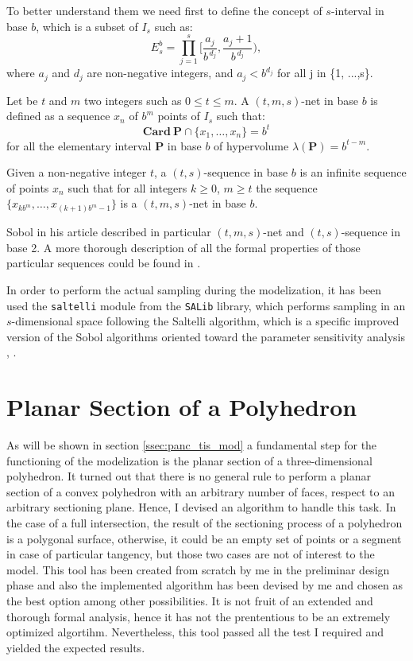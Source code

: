     To better understand them we need first to define the concept of $s$-interval in base $b$, which is a subset of $I_s$ such as:
    \begin{equation}
        E_s^b = \prod_{j=1}^{s} \Bigg[ \frac{a_j}{b^{\,d_j}}, \frac{a_j + 1}{b^{\,d_j}}\Bigg),
    \end{equation}
    where $a_j$ and $d_j$ are non-negative integers, and $a_j < b^{d_j}$ for all j in \{1, ...,s\}.

    Let be $t$ and $m$ two integers such as $0 \leq t \leq m$. A $(t,m,s)$-net in base $b$ is defined as a sequence $x_n$ of $b^m$ points of $I_s$ such that:
    \begin{equation}
        \mathbf{Card} \ \mathbf{P} \cap \{x_1, \dots, x_n \} = b^t
    \end{equation}
    for all the elementary  interval $\mathbf{P}$ in base $b$ of hypervolume $\lambda(\mathbf{P}) =  b^{t-m}$.

    Given a non-negative integer $t$, a $(t,s)$-sequence in base $b$ is an infinite sequence of points $x_n$ such that for all integers $k \geq 0$, $m \geq t$ the sequence $ \{ x_{kb^m}, \dots, x_{(k+1)b^m-1} \}$ is a $(t,m,s)$-net in base $b$.

    Sobol in his article described in particular $(t,m,s)$-net and $(t,s)$-sequence in base 2. A more thorough description of all the formal properties of those particular sequences could be found in \cite{SOBOL1976236}.

    In order to perform the actual sampling during the modelization, it has been used the \texttt{saltelli} module from the \texttt{SALib} library, which performs sampling in an $s$-dimensional space following the Saltelli algorithm, which is a specific improved version of the Sobol algorithms oriented toward the parameter sensitivity analysis \cite{SALTELLI2002280}, \cite{SALTELLI2010259}.

\section{Planar Section of a Polyhedron} \label{ssec:pol_sec}
    As will be shown in section \ref{ssec:panc_tis_mod} a fundamental step for the functioning of the modelization is the planar section of a three-dimensional polyhedron. It turned out that there is no general rule to perform a planar section of a convex polyhedron with an arbitrary number of faces, respect to an arbitrary sectioning plane. Hence, I devised an algorithm to handle this task. In the case of a full intersection, the result of the sectioning process of a polyhedron is a polygonal surface, otherwise, it could be an empty set of points or a segment in case of particular tangency, but those two cases are not of interest to the model. This tool has been created from scratch by me in the preliminar design phase and also the implemented algorithm has been devised by me and chosen as the best option among other possibilities. It is not fruit of an extended and thorough formal analysis, hence it has not the prententious to be an extremely optimized algortihm. Nevertheless, this tool passed all the test I required and yielded the expected results.

